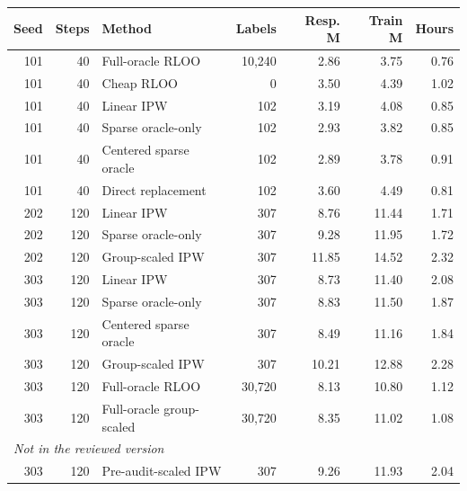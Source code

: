 \begin{tabular}{rrlrrrr}
\toprule
Seed & Steps & Method & Labels & Resp. M & Train M & Hours \\
\midrule
101 & 40 & Full-oracle RLOO & 10,240 & 2.86 & 3.75 & 0.76 \\
101 & 40 & Cheap RLOO & 0 & 3.50 & 4.39 & 1.02 \\
101 & 40 & Linear IPW & 102 & 3.19 & 4.08 & 0.85 \\
101 & 40 & Sparse oracle-only & 102 & 2.93 & 3.82 & 0.85 \\
101 & 40 & Centered sparse oracle & 102 & 2.89 & 3.78 & 0.91 \\
101 & 40 & Direct replacement & 102 & 3.60 & 4.49 & 0.81 \\
202 & 120 & Linear IPW & 307 & 8.76 & 11.44 & 1.71 \\
202 & 120 & Sparse oracle-only & 307 & 9.28 & 11.95 & 1.72 \\
202 & 120 & Group-scaled IPW & 307 & 11.85 & 14.52 & 2.32 \\
303 & 120 & Linear IPW & 307 & 8.73 & 11.40 & 2.08 \\
303 & 120 & Sparse oracle-only & 307 & 8.83 & 11.50 & 1.87 \\
303 & 120 & Centered sparse oracle & 307 & 8.49 & 11.16 & 1.84 \\
303 & 120 & Group-scaled IPW & 307 & 10.21 & 12.88 & 2.28 \\
303 & 120 & Full-oracle RLOO & 30,720 & 8.13 & 10.80 & 1.12 \\
303 & 120 & Full-oracle group-scaled & 30,720 & 8.35 & 11.02 & 1.08 \\
\midrule
\multicolumn{7}{l}{\emph{Not in the reviewed version}} \\
303 & 120 & Pre-audit-scaled IPW & 307 & 9.26 & 11.93 & 2.04 \\

\end{tabular}
